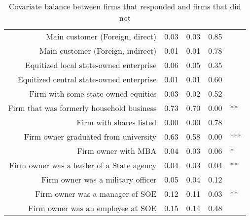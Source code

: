 \begin{table}[ht]
\begin{tabular}{rrrrl}
  Main customer (Foreign, direct) & 0.03 & 0.03 & 0.85 &  \\ 
  Main customer (Foreign, indirect) & 0.01 & 0.01 & 0.78 &  \\ 
  Equitized local state-owned enterprise & 0.06 & 0.05 & 0.35 &  \\ 
  Equitized central state-owned enterprise & 0.01 & 0.01 & 0.60 &  \\ 
  Firm with some state-owned equities & 0.03 & 0.02 & 0.52 &  \\ 
  Firm that was formerly household business & 0.73 & 0.70 & 0.00 & ** \\ 
  Firm with shares listed & 0.00 & 0.00 & 0.78 &  \\ 
  Firm owner graduated from university & 0.63 & 0.58 & 0.00 & *** \\ 
  Firm owner with MBA & 0.04 & 0.03 & 0.06 & * \\ 
  Firm owner was a leader of a State agency & 0.04 & 0.03 & 0.04 & ** \\ 
  Firm owner was a military officer & 0.05 & 0.04 & 0.12 &  \\ 
  Firm owner was a manager of SOE & 0.12 & 0.11 & 0.03 & ** \\ 
  Firm owner was an employee at SOE & 0.15 & 0.14 & 0.48 &  \\ 
   \hline
\end{tabular}
\caption{Covariate balance between firms that responded and firms that did not}
\label{tab:balance_response}
\end{table}